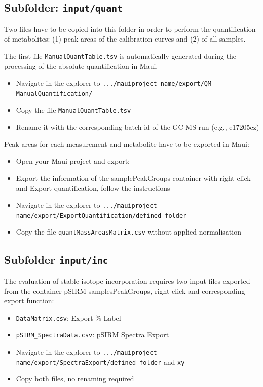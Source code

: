\documentclass[]{book}
\providecommand{\tightlist}{%
  \setlength{\itemsep}{0pt}\setlength{\parskip}{0pt}}
\theoremstyle{definition}
\theoremstyle{definition}
\theoremstyle{definition}
\theoremstyle{remark}
\begin{document}
\subsection{\texorpdfstring{Subfolder:
\texttt{input/quant}}{Subfolder: input/quant}}\label{subfolder-inputquant}

Two files have to be copied into this folder in order to perform the
quantification of metabolites: (1) peak areas of the calibration curves
and (2) of all samples.

The first file \texttt{ManualQuantTable.tsv} is automatically generated
during the processing of the absolute quantification in Maui.

\begin{itemize}
\tightlist
\item
  Navigate in the explorer to
  \texttt{.../mauiproject-name/export/QM-ManualQuantification/}
\item
  Copy the file \texttt{ManualQuantTable.tsv}
\item
  Rename it with the corresponding batch-id of the GC-MS run (e.g.,
  e17205cz)
\end{itemize}

Peak areas for each measurement and metabolite have to be exported in
Maui:

\begin{itemize}
\tightlist
\item
  Open your Maui-project and export:
\item
  Export the information of the samplePeakGroups container with
  right-click and Export quantification, follow the instructions
\item
  Navigate in the explorer to
  \texttt{.../mauiproject-name/export/ExportQuantification/defined-folder}
\item
  Copy the file \texttt{quantMassAreasMatrix.csv} without applied
  normalisation
\end{itemize}

\subsection{\texorpdfstring{Subfolder
\texttt{input/inc}}{Subfolder input/inc}}\label{subfolder-inputinc}

The evaluation of stable isotope incorporation requires two input files
exported from the container pSIRM-samplesPeakGroups, right click and
corresponding export function:

\begin{itemize}
\tightlist
\item
  \texttt{DataMatrix.csv}: Export \% Label
\item
  \texttt{pSIRM\_SpectraData.csv}: pSIRM Spectra Export
\item
  Navigate in the explorer to
  \texttt{.../mauiproject-name/export/SpectraExport/defined-folder} and
  \texttt{xy}
\item
  Copy both files, no renaming required
\end{itemize}
\end{document}
